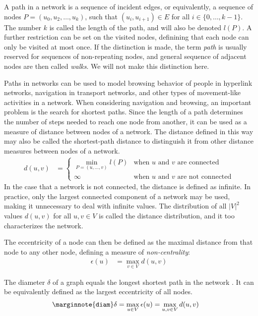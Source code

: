\documentclass{article}
\begin{document}
A path in a network is a sequence of incident edges, or equivalently, a
sequence of nodes $P = (u_0, u_2, \dotsc, u_k)$, such that $(u_i,
u_{i+1})\in E$ for all $i \in \{0, \dotsc, k-1\}$.  The number $k$ is
called the length of the path, and will also be denoted $l(P)$.  A
further restriction can be set on the visited nodes, definining that
each node can only be visited at most once. If the distinction is made,
the term \emph{path} is usually reserved for sequences of non-repeating
nodes, and general sequence of adjacent nodes are then called
\emph{walks}.  We will not make this distinction here.

Paths in networks can be used to model browsing behavior of people in
hyperlink networks, navigation in transport networks, and other types of
movement-like activities in a network.  When considering navigation and
browsing, an important problem is the search for shortest paths.  Since
the length of a path determines the number of steps needed to reach one
node from another, it can be used as a measure of distance between nodes
of a network.  The distance defined in this way may also be called the
shortest-path distance to distinguish it from other distance measures
between nodes of a network.
\begin{align}
  d(u, v) &= \left\{ \begin{array} {ll} \min_{P=(u, \dotsc, v)} l(P) &
    \text{when $u$ and $v$ are connected} \\ \infty & \text{when $u$ and
      $v$ are not connected}
  \end{array} \right. 
\end{align}
In the case that a network is not connected, the distance is defined as
infinite.  In practice, only the largest connected component of a
network may be used, making it unnecessary to deal with infinite values.
The distribution of all $|V|^2$ values $d(u,v)$ for all $u,v\in V$ is
called the distance distribution, and it too characterizes the network.

The eccentricity of a node can then be defined as the maximal distance
from that node to any other node, defining a measure of
\emph{non-centrality}:
\begin{align}
  \epsilon(u) &= \max_{v\in V} d(u,v)
\end{align}

The diameter $\delta$ of a graph equals the longest shortest path in the
network \citep{b779}.  It can be equivalently defined as the largest eccentricity of
all nodes.
\begin{align}
  \marginnote{\texttt{diam}} \delta &= \max_{u \in V} \epsilon(u) =
  \max_{u,v \in V} d(u,v)
\end{align}
\end{document}
